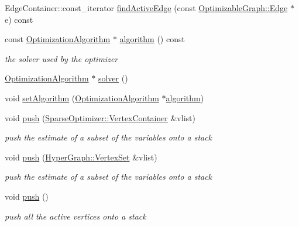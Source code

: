 \begin{DoxyCompactItemize}
Edge\+Container\+::const\+\_\+iterator \mbox{\hyperlink{classg2o_1_1_sparse_optimizer_a3b8397148c3b75539043df83412829bd}{find\+Active\+Edge}} (const \mbox{\hyperlink{classg2o_1_1_optimizable_graph_1_1_edge}{Optimizable\+Graph\+::\+Edge}} $\ast$e) const
\item 
const \mbox{\hyperlink{classg2o_1_1_optimization_algorithm}{Optimization\+Algorithm}} $\ast$ \mbox{\hyperlink{classg2o_1_1_sparse_optimizer_aa08ce344e31a461426289a638b33332a}{algorithm}} () const
\begin{DoxyCompactList}\small\item\em the solver used by the optimizer \end{DoxyCompactList}\item 
\mbox{\hyperlink{classg2o_1_1_optimization_algorithm}{Optimization\+Algorithm}} $\ast$ \mbox{\hyperlink{classg2o_1_1_sparse_optimizer_aaa505e19f70caa4f0a8fe8eccdbcd768}{solver}} ()
\item 
void \mbox{\hyperlink{classg2o_1_1_sparse_optimizer_a5ed7404ef361b479c75a0baf34e0a2bd}{set\+Algorithm}} (\mbox{\hyperlink{classg2o_1_1_optimization_algorithm}{Optimization\+Algorithm}} $\ast$\mbox{\hyperlink{classg2o_1_1_sparse_optimizer_aa08ce344e31a461426289a638b33332a}{algorithm}})
\item 
void \mbox{\hyperlink{classg2o_1_1_sparse_optimizer_a08833d6f9ae487f5608f6113f3635b6b}{push}} (\mbox{\hyperlink{classg2o_1_1_hyper_graph_a9339534c99300a0ddac87ba976ef188c}{Sparse\+Optimizer\+::\+Vertex\+Container}} \&vlist)
\begin{DoxyCompactList}\small\item\em push the estimate of a subset of the variables onto a stack \end{DoxyCompactList}\item 
void \mbox{\hyperlink{classg2o_1_1_sparse_optimizer_ac9a5fd64764e61d99e8a90734118a8bf}{push}} (\mbox{\hyperlink{classg2o_1_1_hyper_graph_a703938cdb4bb636860eed55a2489d70c}{Hyper\+Graph\+::\+Vertex\+Set}} \&vlist)
\begin{DoxyCompactList}\small\item\em push the estimate of a subset of the variables onto a stack \end{DoxyCompactList}\item 
void \mbox{\hyperlink{classg2o_1_1_sparse_optimizer_a4c121d69052291775860d06507aba698}{push}} ()
\begin{DoxyCompactList}\small\item\em push all the active vertices onto a stack \end{DoxyCompactList}\item 

\end{DoxyCompactItemize}
